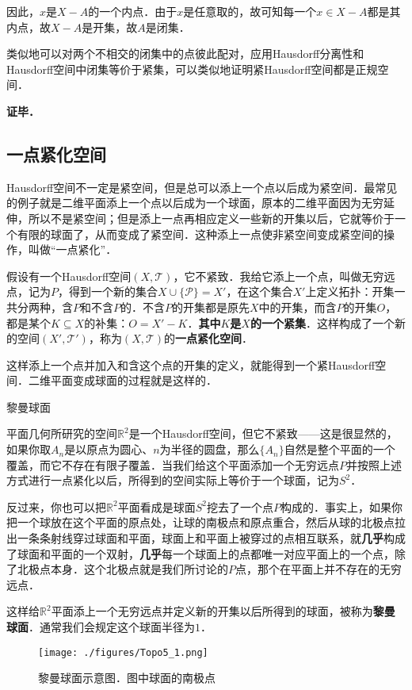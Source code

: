 因此，$x$是$X-A$的一个内点．由于$x$是任意取的，故可知每一个$x\in X-A$都是其内点，故$X-A$是开集，故$A$是闭集．

类似地可以对两个不相交的闭集中的点彼此配对，应用Hausdorff分离性和Hausdorff空间中闭集等价于紧集，可以类似地证明紧Hausdorff空间都是正规空间．


\textbf{证毕．}

\subsection{一点紧化空间}

Hausdorff空间不一定是紧空间，但是总可以添上一个点以后成为紧空间．最常见的例子就是二维平面添上一个点以后成为一个球面，原本的二维平面因为无穷延伸，所以不是紧空间；但是添上一点再相应定义一些新的开集以后，它就等价于一个有限的球面了，从而变成了紧空间．这种添上一点使非紧空间变成紧空间的操作，叫做“一点紧化”．

假设有一个Hausdorff空间$(X, \mathcal{T})$，它不紧致．我给它添上一个点，叫做无穷远点，记为$P$，得到一个新的集合$X\cup \{\mathcal{P}\}=X'$，在这个集合$X'$上定义拓扑：开集一共分两种，含$P$和不含$P$的．不含$P$的开集都是原先$X$中的开集，而含$P$的开集$O$，都是某个$K\subseteq X$的补集：$O=X'-K$．\textbf{其中$K$是$X$的一个紧集}．这样构成了一个新的空间$(X', \mathcal{T}')$，称为$(X, \mathcal{T})$的\textbf{一点紧化空间}．

这样添上一个点并加入和含这个点的开集的定义，就能得到一个紧Hausdorff空间．二维平面变成球面的过程就是这样的．

\begin{example}{黎曼球面}

平面几何所研究的空间$\mathbb{R}^2$是一个Hausdorff空间，但它不紧致——这是很显然的，如果你取$A_n$是以原点为圆心、$n$为半径的圆盘，那么$\{A_n\}$自然是整个平面的一个覆盖，而它不存在有限子覆盖．当我们给这个平面添加一个无穷远点$P$并按照上述方式进行一点紧化以后，所得到的空间实际上等价于一个球面，记为$S^2$．

反过来，你也可以把$\mathbb{R}^2$平面看成是球面$S^2$挖去了一个点$P$构成的．事实上，如果你把一个球放在这个平面的原点处，让球的南极点和原点重合，然后从球的北极点拉出一条条射线穿过球面和平面，球面上和平面上被穿过的点相互联系，就\textbf{几乎}构成了球面和平面的一个双射，\textbf{几乎}每一个球面上的点都唯一对应平面上的一个点，除了北极点本身．这个北极点就是我们所讨论的$P$点，那个在平面上并不存在的无穷远点．

这样给$\mathbb{R}^2$平面添上一个无穷远点并定义新的开集以后所得到的球面，被称为\textbf{黎曼球面}．通常我们会规定这个球面半径为$1$．

\begin{figure}[ht]
\centering
\texttt{[image: ./figures/Topo5\_1.png]}
\caption{黎曼球面示意图．图中球面的南极点} \label{Topo5_fig1}
\end{figure}
\end{example}